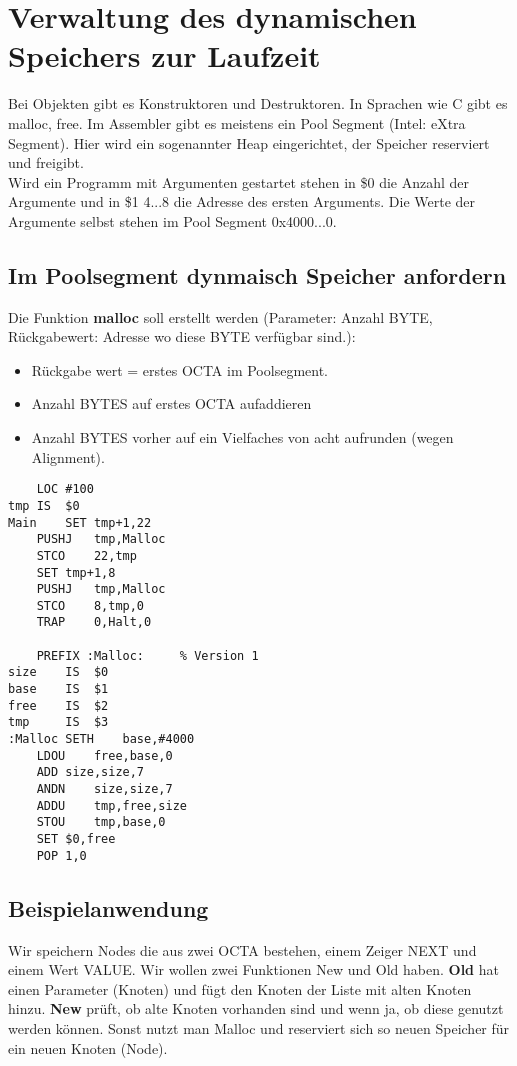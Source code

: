 \renewcommand{\ldate}{2015-06-10}	%
\fancyfoot[R]{\tiny{SS 2015 / \ldate}}

\section{Verwaltung des dynamischen Speichers zur Laufzeit}
Bei Objekten gibt es Konstruktoren und Destruktoren. In Sprachen wie C gibt es malloc, free. Im Assembler gibt es meistens ein Pool Segment (Intel: eXtra Segment). Hier wird ein sogenannter Heap eingerichtet, der Speicher reserviert und freigibt. \\
Wird ein Programm mit Argumenten gestartet stehen in \$0 die Anzahl der Argumente und in \$1 4...8 die Adresse des ersten Arguments. Die Werte der Argumente selbst stehen im Pool Segment 0x4000...0.

\subsection{Im Poolsegment dynmaisch Speicher anfordern}
Die Funktion \textbf{malloc} soll erstellt werden (Parameter: Anzahl BYTE, Rückgabewert: Adresse wo diese BYTE verfügbar sind.):
\begin{itemize}
\item Rückgabe wert = erstes OCTA im Poolsegment.
\item Anzahl BYTES auf erstes OCTA aufaddieren
\item Anzahl BYTES vorher auf ein Vielfaches von acht aufrunden (wegen Alignment).
\end{itemize}

\begin{lstlisting}
	LOC #100
tmp	IS	$0
Main	SET	tmp+1,22
	PUSHJ	tmp,Malloc
	STCO	22,tmp
	SET	tmp+1,8
	PUSHJ	tmp,Malloc
	STCO	8,tmp,0
	TRAP	0,Halt,0
	
	PREFIX :Malloc:		% Version 1
size	IS	$0
base	IS	$1
free	IS	$2
tmp		IS	$3
:Malloc SETH	base,#4000
	LDOU	free,base,0
	ADD	size,size,7
	ANDN	size,size,7
	ADDU	tmp,free,size
	STOU	tmp,base,0
	SET	$0,free 
	POP	1,0	
\end{lstlisting}

\subsection{Beispielanwendung}
Wir speichern Nodes die aus zwei OCTA bestehen, einem Zeiger NEXT und einem Wert VALUE. Wir wollen zwei Funktionen New und Old haben. \textbf{Old} hat einen Parameter (Knoten) und fügt den Knoten der Liste mit alten Knoten hinzu. \textbf{New} prüft, ob alte Knoten vorhanden sind und wenn ja, ob diese genutzt werden können. Sonst nutzt man Malloc und reserviert sich so neuen Speicher für ein neuen Knoten (Node). 

